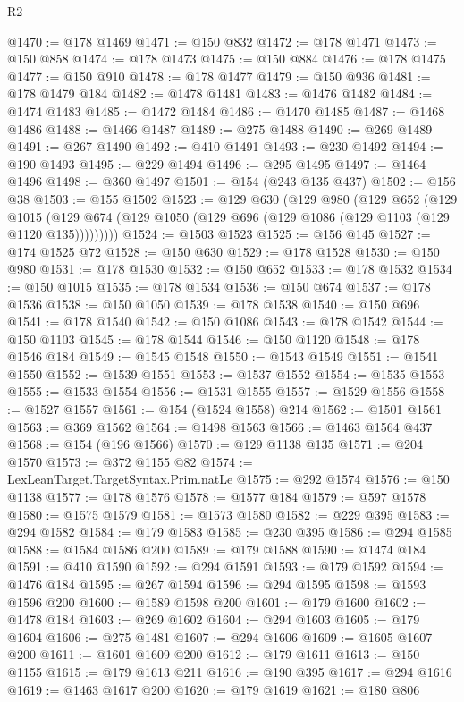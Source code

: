 \begin{lexlean}{R2}
\begin{coremodule}
@1470 := @178 @1469
@1471 := @150 @832
@1472 := @178 @1471
@1473 := @150 @858
@1474 := @178 @1473
@1475 := @150 @884
@1476 := @178 @1475
@1477 := @150 @910
@1478 := @178 @1477
@1479 := @150 @936
@1481 := @178 @1479 @184
@1482 := @1478 @1481
@1483 := @1476 @1482
@1484 := @1474 @1483
@1485 := @1472 @1484
@1486 := @1470 @1485
@1487 := @1468 @1486
@1488 := @1466 @1487
@1489 := @275 @1488
@1490 := @269 @1489
@1491 := @267 @1490
@1492 := @410 @1491
@1493 := @230 @1492
@1494 := @190 @1493
@1495 := @229 @1494
@1496 := @295 @1495
@1497 := @1464 @1496
@1498 := @360 @1497
@1501 := @154 (@243 @135 @437)
@1502 := @156 @38
@1503 := @155 @1502
@1523 := @129
    @630
    (@129
      @980
      (@129
        @652
        (@129
          @1015
          (@129 @674 (@129 @1050 (@129 @696 (@129 @1086 (@129 @1103 (@129 @1120 @135)))))))))
@1524 := @1503 @1523
@1525 := @156 @145
@1527 := @174 @1525 @72
@1528 := @150 @630
@1529 := @178 @1528
@1530 := @150 @980
@1531 := @178 @1530
@1532 := @150 @652
@1533 := @178 @1532
@1534 := @150 @1015
@1535 := @178 @1534
@1536 := @150 @674
@1537 := @178 @1536
@1538 := @150 @1050
@1539 := @178 @1538
@1540 := @150 @696
@1541 := @178 @1540
@1542 := @150 @1086
@1543 := @178 @1542
@1544 := @150 @1103
@1545 := @178 @1544
@1546 := @150 @1120
@1548 := @178 @1546 @184
@1549 := @1545 @1548
@1550 := @1543 @1549
@1551 := @1541 @1550
@1552 := @1539 @1551
@1553 := @1537 @1552
@1554 := @1535 @1553
@1555 := @1533 @1554
@1556 := @1531 @1555
@1557 := @1529 @1556
@1558 := @1527 @1557
@1561 := @154 (@1524 @1558) @214
@1562 := @1501 @1561
@1563 := @369 @1562
@1564 := @1498 @1563
@1566 := @1463 @1564 @437
@1568 := @154 (@196 @1566)
@1570 := @129 @1138 @135
@1571 := @204 @1570
@1573 := @372 @1155 @82
@1574 := LexLeanTarget.TargetSyntax.Prim.natLe
@1575 := @292 @1574
@1576 := @150 @1138
@1577 := @178 @1576
@1578 := @1577 @184
@1579 := @597 @1578
@1580 := @1575 @1579
@1581 := @1573 @1580
@1582 := @229 @395
@1583 := @294 @1582
@1584 := @179 @1583
@1585 := @230 @395
@1586 := @294 @1585
@1588 := @1584 @1586 @200
@1589 := @179 @1588
@1590 := @1474 @184
@1591 := @410 @1590
@1592 := @294 @1591
@1593 := @179 @1592
@1594 := @1476 @184
@1595 := @267 @1594
@1596 := @294 @1595
@1598 := @1593 @1596 @200
@1600 := @1589 @1598 @200
@1601 := @179 @1600
@1602 := @1478 @184
@1603 := @269 @1602
@1604 := @294 @1603
@1605 := @179 @1604
@1606 := @275 @1481
@1607 := @294 @1606
@1609 := @1605 @1607 @200
@1611 := @1601 @1609 @200
@1612 := @179 @1611
@1613 := @150 @1155
@1615 := @179 @1613 @211
@1616 := @190 @395
@1617 := @294 @1616
@1619 := @1463 @1617 @200
@1620 := @179 @1619
@1621 := @180 @806

\end{coremodule}
\end{lexlean}
